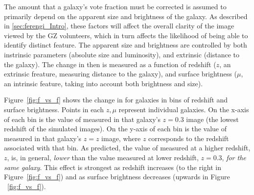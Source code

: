 The amount that a galaxy's \ffeatures{} vote fraction must be corrected is assumed to primarily depend on the apparent size and brightness of the galaxy. As described in \ref{sec:ferengi_Intro}, these factors will affect the overall clarity of the image viewed by the GZ volunteers, which in turn affects the likelihood of being able to identify distinct feature. The apparent size and brightness are controlled by both instrinsic parameters (absolute size and luminosity), and extrinsic (distance to the galaxy). The change in \ffeatures{} then is measured as a function of redshift ($z$, an extrinsic freature, measuring distance to the galaxy), and surface brightness ($\mu$, an intrinsic feature, taking into account both brightness and size).   

Figure~\ref{fig:f_vs_f} shows the change in \ffeatures{} for \ferengi{} galaxies in bins of redshift and surface brightness. Points in each $z,\mu$ represent individual \ferengi{} galaxies. On the x-axis of each bin is the value of \ffeatures{} measured in that galaxy's $z=0.3$ image (the lowest redshift of the simulated images). On the y-axis of each bin is the value of \ffeatures{} measured in that galaxy's $z=z$ image, where $z$ corresponds to the redshift associated with that bin. As predicted, the value of \ffeatures{} measured at a higher redshift, $z$, is, in general, \emph{lower} than the value measured at lower redshift, $z=0.3$, \emph{for the same galaxy}. This effect is strongest as redshift increases (to the right in Figure~\ref{fig:f_vs_f}) and as surface brightness decreases (upwards in Figure ~\ref{fig:f_vs_f}). 

